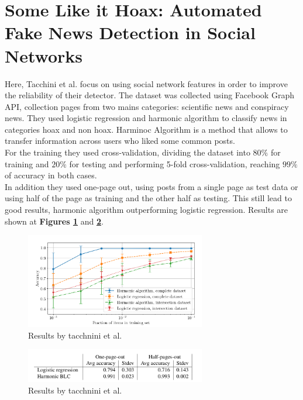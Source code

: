 \section{Some Like it Hoax: Automated Fake News Detection in Social Networks \cite{Tacchini2017}}
Here, Tacchini et al. focus on using social network features in order to improve the reliability of their detector. The dataset was collected using Facebook Graph API, collection pages from two mains categories: scientific news and conspiracy news. They used logistic regression and harmonic algorithm\cite{NIPS2011_4396} to classify news in categories hoax and non hoax. Harminoc Algorithm is a method that allows to transfer information across users who liked some common posts. \\

For the training they used cross-validation, dividing the dataset into $80\%$ for training and $20\%$ for testing and performing 5-fold cross-validation, reaching $99\%$ of accuracy in both cases. \\

In addition they used one-page out, using posts from a single page as test data or using half of the page as training and the other half as testing. This still lead to good results, harmonic algorithm outperforming logistic regression. Results are shown at \textbf{Figures \ref{fig:chap1:tacchini}} and \textbf{\ref{fig:chap1:tacchini2}}. \\


\begin{figure}[h]
	\centering
	\includegraphics[width=0.7\textwidth]{images/chap1_bis/rev4.png}
	\caption{Results by tacchnini et al. }
	\label{fig:chap1:tacchini}
\end{figure}

\begin{figure}[h]
	\centering
	\includegraphics[width=0.7\textwidth]{images/chap1_bis/rev5.png}
	\caption{Results by tacchnini et al. }
	\label{fig:chap1:tacchini2}
\end{figure}

